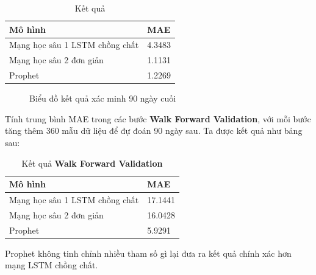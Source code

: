 \begin{table}[h]
	\begin{tabularx}{\textwidth}{X | X }
		Mô hình	& MAE	  \\ \hline
		Mạng học sâu 1 LSTM chồng chất	& 4.3483 \\ \hline
		Mạng học sâu 2 đơn giản	& 1.1131 \\ \hline
		Prophet	& 1.2269 \\
	\end{tabularx}
	\label{tab:result}
	\caption{Kết quả}
\end{table}
\begin{figure}[h]
    \caption{\label{fig:result-chart} Biểu đồ kết quả xác minh 90 ngày cuối}
\end{figure}

Tính trung bình MAE trong các bước \textbf{Walk Forward Validation}, với mỗi bước tăng thêm 360 mẫu dữ liệu để đự đoán 90 ngày sau. Ta được kết quả như bảng sau: \\

\begin{table}[h]
	\begin{tabularx}{\textwidth}{X | X }
		Mô hình	& MAE	  \\ \hline
		Mạng học sâu 1 LSTM chồng chất & 17.1441 \\ \hline
		Mạng học sâu 2 đơn giản & 16.0428 \\ \hline
		Prophet	& 5.9291 \\
	\end{tabularx}
	\label{tab:resulttimewalking}
	\caption{Kết quả \textbf{Walk Forward Validation}}
\end{table}

Prophet không tinh chỉnh nhiều tham số gì lại đưa ra kết quả chính xác hơn mạng LSTM chồng chất.
